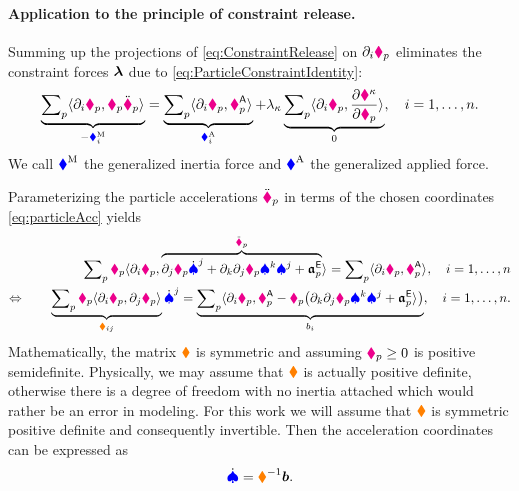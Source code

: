 \paragraph{Application to the principle of constraint release.}
Summing up the projections of \eqref{eq:ConstraintRelease} on $\dirDiff{\LidxI}\particlePos{\PidxI}$ eliminates the constraint forces $\LagrangeMult$ due to \eqref{eq:ParticleConstraintIdentity}:
\begin{align}\label{eq:ConstraintReleaseEliminated}
 \underbrace{\sumParticles \sProd{\dirDiff{\LidxI} \particlePos{\PidxI}}{\particleMass{\PidxI} \particlePosdd{\PidxI}}}_{-\genForceInertiaCoeff{\LidxI}}
 = \underbrace{\sumParticles \sProd{\dirDiff{\LidxI} \particlePos{\PidxI}}{\particleForceImpressed{\PidxI}}}_{\genForceImpressedCoeff{\LidxI}}
 + \LagrangeMultCoeff{\CidxI} \underbrace{\sumParticles \sProd{\dirDiff{\LidxI} \particlePos{\PidxI}}{\pdiff[\particleGeoConstraintCoeff{\CidxI}]{\particlePos{\PidxI}}}}_{0},
 \quad \LidxI = 1,\ldots,\dimConfigSpace.
\end{align}
We call $\genForceInertia$ the generalized inertia force and $\genForceImpressed$ the generalized applied force.

Parameterizing the particle accelerations $\particlePosdd{\PidxI}$ in terms of the chosen coordinates \eqref{eq:particleAcc} yields 
\begin{align}
 \sumParticles \particleMass{\PidxI} \sProd{\dirDiff{\LidxI} \particlePos{\PidxI}}{\overbrace{\dirDiff{\LidxII} \particlePos{\PidxI} \sysVelCoeffd{\LidxII} + \dirDiff{\LidxIII} \dirDiff{\LidxII} \particlePos{\PidxI} \sysVelCoeff{\LidxIII} \sysVelCoeff{\LidxII} + \particleAccTime{\PidxI}}^{\particlePosdd{\PidxI}}}
 = \sumParticles \sProd{\dirDiff{\LidxI} \particlePos{\PidxI}}{\particleForceImpressed{\PidxI}},
 \quad \LidxI = 1,\ldots,\dimConfigSpace
\nonumber\\
\Leftrightarrow \qquad
 \underbrace{\sumParticles \particleMass{\PidxI} \sProd{\dirDiff{\LidxI} \particlePos{\PidxI}}{\dirDiff{\LidxII} \particlePos{\PidxI}}}_{\sysInertiaMatCoeff{\LidxI\LidxII}} \sysVelCoeffd{\LidxII}
 = \underbrace{\sumParticles \sProd{\dirDiff{\LidxI} \particlePos{\PidxI}}{\particleForceImpressed{\PidxI} - \particleMass{\PidxI} \big(\dirDiff{\LidxIII} \dirDiff{\LidxII} \particlePos{\PidxI} \sysVelCoeff{\LidxIII} \sysVelCoeff{\LidxII} + \particleAccTime{\PidxI}}\big)}_{\sysForceCoeff{\LidxI}},
 \quad \LidxI = 1,\ldots,\dimConfigSpace.
\end{align}
Mathematically, the matrix $\sysInertiaMat$ is symmetric and assuming $\particleMass{\PidxI} \geq 0$ is positive semidefinite.
Physically, we may assume that $\sysInertiaMat$ is actually positive definite, otherwise there is a degree of freedom with no inertia attached which would rather be an error in modeling.
For this work we will assume that $\sysInertiaMat$ is symmetric positive definite and consequently invertible.
Then the acceleration coordinates can be expressed as 
\begin{align}
 \sysVeld = \sysInertiaMat^{-1} \sysForce.
\end{align}

